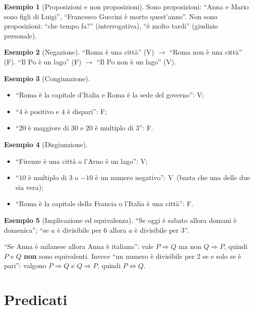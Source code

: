 \documentclass[11pt,a4paper]{article}
\theoremstyle{definition}
\newtheorem*{esempio}{Esempio}
\newcommand{\V}{\textsf{V}}
\newcommand{\F}{\textsf{F}}
\begin{document}
\begin{esempio}[Proposizioni e non proposizioni]
Sono proposizioni: ``Anna e Mario sono figli di Luigi'', ``Francesco Guccini è morto quest'anno''. Non sono proposizioni: ``che tempo fa?'' (interrogativa), ``è molto tardi'' (giudizio personale).
\end{esempio}

\begin{esempio}[Negazione]
``Roma è una città'' (\V) $\to$ ``Roma non è una città'' (\F).
``Il Po è un lago'' (\F) $\to$ ``Il Po non è un lago'' (\V).
\end{esempio}

\begin{esempio}[Congiunzione]
\begin{itemize}
    \item ``Roma è la capitale d'Italia e Roma è la sede del governo'': \V;
    \item ``$4$ è positivo e $4$ è dispari'': \F;
    \item ``$20$ è maggiore di $30$ e $20$ è multiplo di $3$'': \F.
\end{itemize}
\end{esempio}

\begin{esempio}[Disgiunzione]
\begin{itemize}
    \item ``Firenze è una città o l'Arno è un lago'': \V;
    \item ``$10$ è multiplo di $3$ o $-10$ è un numero negativo'': \V\ (basta che una delle due sia vera);
    \item ``Roma è la capitale della Francia o l'Italia è una città'': \F.
\end{itemize}
\end{esempio}

\begin{esempio}[Implicazione ed equivalenza]
``Se oggi è sabato allora domani è domenica''; ``se $a$ è divisibile per $6$ allora $a$ è divisibile per $3$''.

``Se Anna è milanese allora Anna è italiana'': vale $P \Rightarrow Q$ ma non $Q \Rightarrow P$, quindi $P$ e $Q$ \textbf{non} sono equivalenti. Invece ``un numero è divisibile per $2$ se e solo se è pari'': valgono $P \Rightarrow Q$ e $Q \Rightarrow P$, quindi $P \Leftrightarrow Q$.
\end{esempio}

\newpage
\section{Predicati}
\end{document}
